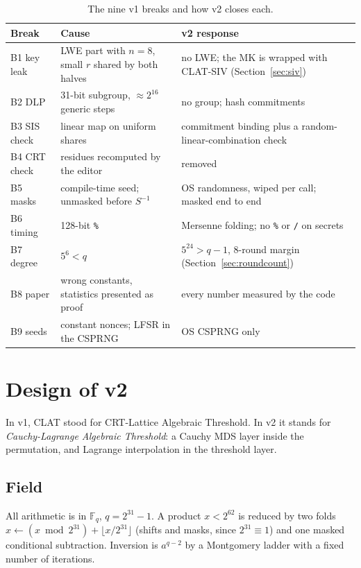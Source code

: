 \documentclass[10pt,a4paper]{article}
\newcommand{\Fq}{\mathbb{F}_q}
\newcommand{\code}[1]{\texttt{#1}}
\theoremstyle{definition}
\theoremstyle{remark}
\begin{document}
\begin{table}[t]
\centering\small
\begin{tabularx}{\linewidth}{@{}l L L@{}}
\toprule
Break & Cause & v2 response \\
\midrule
B1 key leak & LWE part with $n=8$, small $r$ shared by both halves & no LWE; the MK is wrapped with CLAT-SIV (Section~\ref{sec:siv}) \\
B2 DLP & 31-bit subgroup, $\approx 2^{16}$ generic steps & no group; hash commitments \\
B3 SIS check & linear map on uniform shares & commitment binding plus a random-linear-combination check \\
B4 CRT check & residues recomputed by the editor & removed \\
B5 masks & compile-time seed; unmasked before $S^{-1}$ & OS randomness, wiped per call; masked end to end \\
B6 timing & 128-bit \code{\%} & Mersenne folding; no \code{\%} or \code{/} on secrets \\
B7 degree & $5^6 < q$ & $5^{24} > q-1$, 8-round margin (Section~\ref{sec:roundcount}) \\
B8 paper & wrong constants, statistics presented as proof & every number measured by the code \\
B9 seeds & constant nonces; LFSR in the CSPRNG & OS CSPRNG only \\
\bottomrule
\end{tabularx}
\caption{The nine v1 breaks and how v2 closes each.}\label{tab:v1}
\end{table}

\section{Design of v2}\label{sec:design}

In v1, CLAT stood for CRT-Lattice Algebraic Threshold. In v2 it stands for \emph{Cauchy-Lagrange Algebraic Threshold}: a Cauchy MDS layer inside the permutation, and Lagrange interpolation in the threshold layer.

\subsection{Field}
All arithmetic is in $\Fq$, $q = 2^{31}-1$. A product $x < 2^{62}$ is reduced by two folds $x \leftarrow (x \bmod 2^{31}) + \lfloor x/2^{31}\rfloor$ (shifts and masks, since $2^{31} \equiv 1$) and one masked conditional subtraction. Inversion is $a^{q-2}$ by a Montgomery ladder with a fixed number of iterations.
\end{document}
